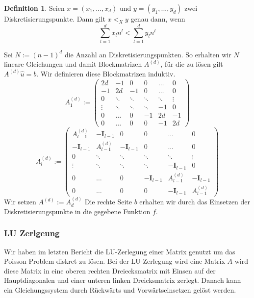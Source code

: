 \documentclass[smallheadings]{scrartcl}
\theoremstyle{definition}
\newtheorem{definition}{Definition}[section]
\begin{document}
		\begin{definition}
		Seien $x=(x_1,...,x_d)$ und $y=(y_1,...,y_d)$ zwei Diskretisierungspunkte. Dann gilt $x <_X y$ genau dann, wenn
		$$\sum_{l=1}^dx_ln^l<\sum_{l=1}^dy_ln^l$$
		\end{definition}
		Sei $N:=(n-1)^d$ die Anzahl an Diskretisierungspunkten.
		So erhalten wir $N$ lineare Gleichungen und damit Blockmatrizen $A^{(d)}$, für die zu lösen gilt $A^{(d)}\hat{u}=b$. Wir definieren diese Blockmatrizen induktiv.
		$$A^{(d)}_{1} := \begin{pmatrix}     2d & -1 & 0 & 0 &\dots&0 \\    -1 & 2d & -1 & 0&\dots&0 \\    0&\ddots&\ddots&\ddots&\ddots&\vdots\\    \vdots & \ddots &\ddots&\ddots&-1&0 \\    0 & \dots&0&-1&2d&-1\\     0&  \dots&0&0&-1&2d    \end{pmatrix}$$
		$$A^{(d)}_{l} := \begin{pmatrix}     A^{(d)}_{l-1} & -\mathbf{I}_{l-1} & 0 & 0 &\dots&0 \\    -\mathbf{I}_{l-1} & A^{(d)}_{l-1} & -\mathbf{I}_{l-1} & 0&\dots&0 \\    0&\ddots&\ddots&\ddots&\ddots&\vdots\\    \vdots & \ddots &\ddots&\ddots&-\mathbf{I}_{l-1}&0 \\    0 & \dots&0&-\mathbf{I}_{l-1}&A^{(d)}_{l-1}&-\mathbf{I}_{l-1}\\     0&  \dots&0&0&-\mathbf{I}_{l-1}&A^{(d)}_{l-1}    \end{pmatrix}$$
		Wir setzen $A^{(d)}:=A^{(d)}_d$ Die rechte Seite $b$ erhalten wir durch das Einsetzen der Diskretisierungspunkte in die gegebene Funktion $f$. \cbend
		\subsubsection{LU Zerlgeung}
		Wir haben im letzten Bericht die LU-Zerlegung einer Matrix genutzt um das Poisson Problem diskret zu lösen. 
		Bei der LU-Zerlegung wird eine Matrix $A$ wird diese Matrix in eine  oberen rechten Dreiecksmatrix mit Einsen auf der Hauptdiagonalen und einer unteren linken Dreicksmatrix zerlegt.  Danach kann ein Gleichungssystem durch Rückwärts und Vorwärtseinsetzen gelöst werden.  
\end{document}
